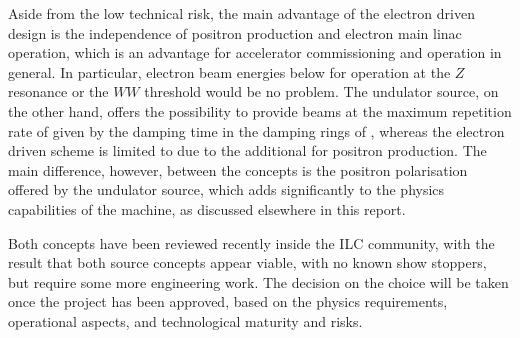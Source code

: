 Aside from the low technical risk, the main advantage of the electron driven design is the independence of positron production and electron main linac operation, which is an advantage for accelerator commissioning and operation in general.
In particular, electron beam energies below  for operation at the $Z$ resonance or the $WW$ threshold would be no problem.
The undulator source, on the other hand, offers the possibility to provide beams at the maximum repetition rate of  given by the damping time in the damping rings of , whereas the electron driven scheme is limited to  due to the additional  for positron production.
The main difference, however, between the concepts is the positron polarisation offered by the undulator source, which adds significantly to the physics capabilities of the machine, as discussed elsewhere in this report. 

Both concepts have been reviewed recently \cite{PWG:2018a} inside the ILC community, with the result that both source concepts appear viable, with no known show stoppers, but require some more engineering work. 
The decision on the choice will be taken once the project has been approved, based on the physics requirements, operational aspects, and technological maturity and risks. 


